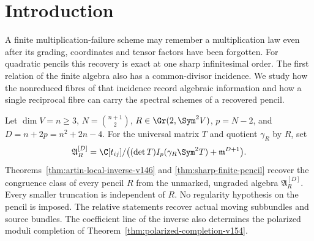 \begin{abstract}
Every complex quadratic pencil is recovered from its unmarked,
ungraded finite multiplication-failure algebra at a sharp order.
We relate this inverse to divisor-incidence geometry.  The entire
quadratic coefficient section of every multivariate reciprocal
normalization fibre is an apolar algebra of a power of the symmetric
determinant; its character, length, socle and nilpotence filtration
are explicit.  In one such section, the power-zero ideals along an
embedded pencil line are exactly powers of all spectral Fitting
ideals.  Their local lengths recover the Segre symbol and express
the native fixed-spectrum specialization order.  We also retain the
finite-flat binary factorization theorem, the squarefree conductor
and branch stratification, the complete incidence atlas for binary
collisions, and the full-coordinate-change common boundary theorem.
The latter boundary and the native pencil-line construction are
different objects.
\end{abstract}
\maketitle

\section{Introduction}
\label{sec:introduction-v153}
A finite multiplication-failure scheme may remember a multiplication
law even after its grading, coordinates and tensor factors have been
forgotten.  For quadratic pencils this recovery is exact at one sharp
infinitesimal order.  The first relation of the finite algebra also
has a common-divisor incidence.  We study how the nonreduced fibres
of that incidence record algebraic information and how a single
reciprocal fibre can carry the spectral schemes of a recovered pencil.

Let $\dim V=n\geq3$, $N=\binom{n+1}{2}$,
$R\in\Gr(2,\Sym^2V)$, $p=N-2$, and $D=n+2p=n^2+2n-4$.
For the universal matrix $T$ and quotient $\gamma_R$ by $R$, set
\[
 \mathfrak A_R^{[D]}=\C[t_{ij}]/
 \bigl((\det T)I_p(\gamma_R\Sym^2T)+\mathfrak m^{D+1}\bigr).
\]
Theorems~\ref{thm:artin-local-inverse-v146} and
\ref{thm:sharp-finite-pencil} recover the congruence class of every
pencil $R$ from the unmarked, ungraded algebra
$\mathfrak A_R^{[D]}$.  Every smaller truncation is independent of
$R$.  No regularity hypothesis on the pencil is imposed.  The
relative statements recover actual moving subbundles and source
bundles.  The coefficient line of the inverse also determines the
polarized moduli completion of
Theorem~\ref{thm:polarized-completion-v154}.

